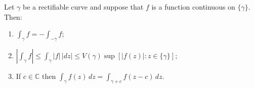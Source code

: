Let $\gamma$ be a rectifiable curve and suppose that $f$ is a function continuous on $\{\gamma\}$. Then:

\begin{enumerate}
\item[(a)] $\displaystyle \int_{\gamma} f = -\int_{-\gamma} f$;
\item[(b)] $\displaystyle \left| \int_{\gamma} f \right| \leq \int_{\gamma} |f| \, |dz| \leq V(\gamma) \sup \left[ |f(z)| : z \in \{\gamma\} \right]$;
\item[(c)] If $c \in \mathbb{C}$ then $\displaystyle \int_{\gamma} f(z) \, dz = \int_{\gamma + c} f(z - c) \, dz$.
\end{enumerate}

